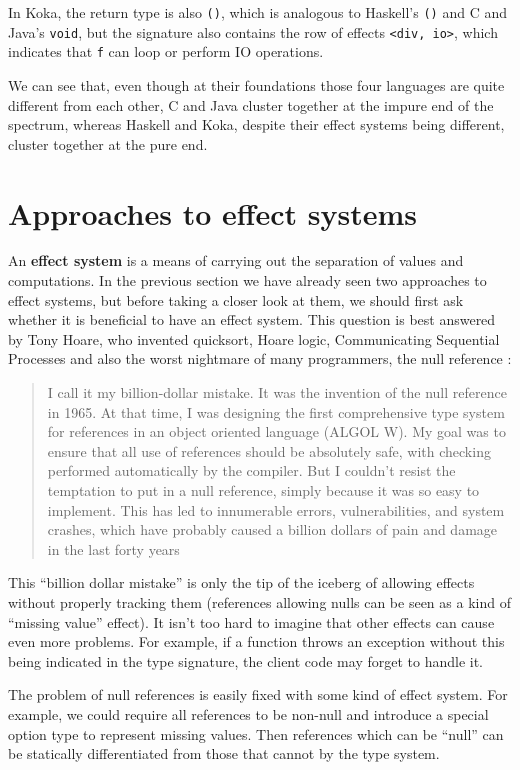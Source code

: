 \documentclass[declaration,inz,english,shortabstract]{iithesis}
\newcommand{\m}[1]{\texttt{#1}}
\begin{document}
In Koka, the return type is also \m{()}, which is analogous to Haskell's \m{()} and C and Java's \m{void}, but the signature also contains the row of effects \m{<div, io>}, which indicates that \m{f} can loop or perform IO operations.

We can see that, even though at their foundations those four languages are quite different from each other, C and Java cluster together at the impure end of the spectrum, whereas Haskell and Koka, despite their effect systems being different, cluster together at the pure end.

\section{Approaches to effect systems}

An \textbf{effect system} is a means of carrying out the separation of values and computations. In the previous section we have already seen two approaches to effect systems, but before taking a closer look at them, we should first ask whether it is beneficial to have an effect system. This question is best answered by Tony Hoare, who invented quicksort, Hoare logic, Communicating Sequential Processes and also the worst nightmare of many programmers, the null reference \cite{BillionDollarMistake}:

\begin{quote}
    I call it my billion-dollar mistake. It was the invention of the null reference in 1965. At that time, I was designing the first comprehensive type system for references in an object oriented language (ALGOL W). My goal was to ensure that all use of references should be absolutely safe, with checking performed automatically by the compiler. But I couldn't resist the temptation to put in a null reference, simply because it was so easy to implement. This has led to innumerable errors, vulnerabilities, and system crashes, which have probably caused a billion dollars of pain and damage in the last forty years
\end{quote}

This ``billion dollar mistake'' is only the tip of the iceberg of allowing effects without properly tracking them (references allowing nulls can be seen as a kind of ``missing value'' effect). It isn't too hard to imagine that other effects  can cause even more problems. For example, if a function throws an exception without this being indicated in the type signature, the client code may forget to handle it.

The problem of null references is easily fixed with some kind of effect system. For example, we could require all references to be non-null and introduce a special option type to represent missing values. Then references which can be ``null'' can be statically differentiated from those that cannot by the type system.
\end{document}
